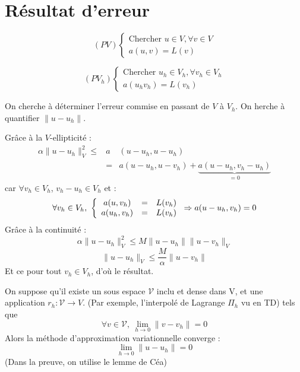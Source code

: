 \section{Résultat d'erreur}
\begin{minipage}{0.4\linewidth}
\[(PV)\left\{\begin{array}{c}
\text{Chercher } u\in V, \forall v\in V\\
a(u,v)=L(v)
\end{array}\right.\]
\end{minipage}\hspace{0.1\linewidth}
\begin{minipage}{0.4\linewidth}
\[(PV_h)\left\{\begin{array}{c}
\text{Chercher } u_h\in V_h, \forall v_h\in V_h\\
	a(u_hv_h)=L(v_h)
\end{array}\right.\]
\end{minipage}

On cherche à déterminer l'erreur commise en passant de $V$ à $V_h$. On herche à quantifier $\|u-u_h\|$.\\

\begin{dem}
Grâce à la $V$-ellipticité :
\begin{eqnarray*}
\alpha\|u-u_h\|_V^2\leq &a&(u-u_h,u-u_h)\\
			&=&a(u-u_h, u-v_h)+\underbrace{a(u-u_h, v_h-u_h)}_{=0}
\end{eqnarray*}
car $\forall v_h\in V_h$, $v_h-u_h\in V_h$ et :
	\[\forall v_h\in V_h,\ \left\{\begin{array}{c c c}
		a(u,v_h)&=&L(v_h)\\
		a(u_h,v_h)&=&L(v_h)
	\end{array}\right. \Rightarrow a(u-u_h,v_h)=0\]
Grâce à la continuité :
	\[\alpha\|u-u_h\|_V^2\leq M\|u-u_h\|\|u-v_h\|_V\]
	\[\|u-u_h\|_V\leq \frac{M}{\alpha} \|u-v_h\|\]
Et ce pour tout $v_h\in V_h$, d'où le résultat.
\end{dem}

On suppose qu'il existe un sous espace $\mathcal{V}$ inclu et dense dans V, et une application $r_h:\mathcal{V}\to V$. (Par exemple, l'interpolé de Lagrange $\Pi_h$ vu en TD) tels que 
	\[\forall v\in \mathcal{V},\ \lim_{h\to 0} \|v-v_h\|=0\]
Alors la méthode d'approximation variationnelle converge :
	\[\lim_{h\to 0} \|u-u_h\| =0\]
(Dans la preuve, on utilise le lemme de Céa)
